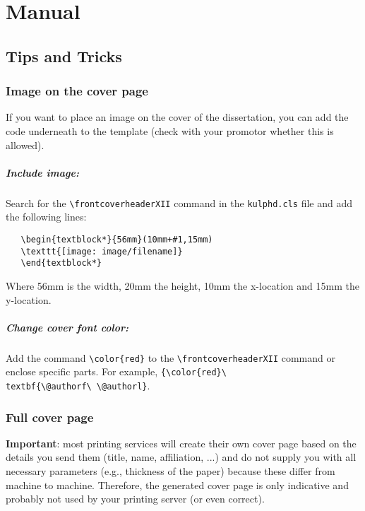 \chapter{Manual}\label{ch:manual}


\section{Tips and Tricks}

\subsection{Image on the cover page}

If you want to place an image on the cover of the dissertation, you can add
the code underneath to the template (check with your promotor whether this is
allowed).

\paragraph{Include image:}
Search for the \texttt{\textbackslash frontcoverheaderXII} command in
the \texttt{kulphd.cls} file and add the following lines:
\begin{verbatim}
   \begin{textblock*}{56mm}(10mm+#1,15mm)
   \texttt{[image: image/filename]}
   \end{textblock*}
\end{verbatim}
Where 56mm is the width, 20mm the height, 10mm the x-location and 15mm the
y-location.

\paragraph{Change cover font color:}
Add the command \texttt{\textbackslash color\{red\}} to the
\texttt{\textbackslash frontcoverheaderXII} command or enclose specific parts.
For example, \texttt{\{\textbackslash color\{red\}\textbackslash
textbf\{\textbackslash @authorf\textbackslash\ \textbackslash @authorl\}}.

\subsection{Full cover page}

\textbf{Important}: most printing services will create their own cover page based
on the details you send them (title, name, affiliation, ...) and do not supply
you with all necessary parameters (e.g., thickness of the paper) because these
differ from machine to machine. Therefore, the generated cover page is only
indicative and probably not used by your printing server (or even correct).


